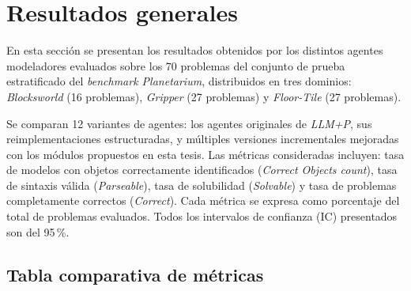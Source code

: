 \section{Resultados generales}

En esta sección se presentan los resultados obtenidos por los distintos agentes modeladores evaluados sobre los 70 problemas del conjunto de prueba estratificado del \textit{benchmark Planetarium}, distribuidos en tres dominios: \textit{Blocksworld} (16 problemas), \textit{Gripper} (27 problemas) y \textit{Floor-Tile} (27 problemas). 

Se comparan 12 variantes de agentes: los agentes originales de \textit{LLM+P}, sus reimplementaciones estructuradas, y múltiples versiones incrementales mejoradas con los módulos propuestos en esta tesis. Las métricas consideradas incluyen: tasa de modelos con objetos correctamente identificados (\textit{Correct Objects count}), tasa de sintaxis válida (\textit{Parseable}), tasa de solubilidad (\textit{Solvable}) y tasa de problemas completamente correctos (\textit{Correct}). Cada métrica se expresa como porcentaje del total de problemas evaluados. Todos los intervalos de confianza (IC) presentados son del 95\,\%.

\subsection*{Tabla comparativa de métricas}

